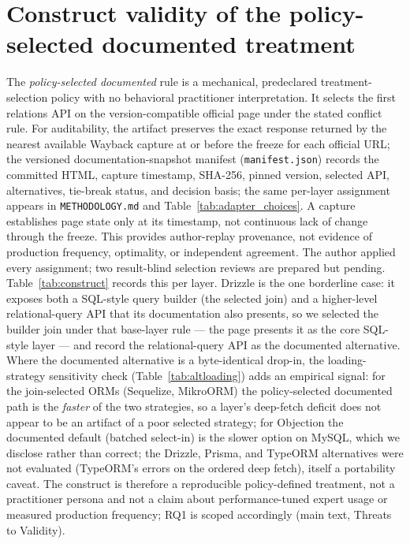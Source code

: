 \documentclass[11pt,a4paper]{article}
\begin{document}
\section{Construct validity of the policy-selected documented treatment}
\label{sup:construct}
The \emph{policy-selected documented} rule is a mechanical, predeclared treatment-selection policy with no behavioral practitioner interpretation. It selects the first relations API on the version-compatible official page under the stated conflict rule. For auditability, the artifact preserves the exact response returned by the nearest available Wayback capture at or before the freeze for each official URL; the versioned documentation-snapshot manifest (\texttt{manifest.json}) records the committed HTML, capture timestamp, SHA-256, pinned version, selected API, alternatives, tie-break status, and decision basis; the same per-layer assignment appears in \texttt{METHODOLOGY.md} and Table~\ref{tab:adapter_choices}. A capture establishes page state only at its timestamp, not continuous lack of change through the freeze. This provides author-replay provenance, not evidence of production frequency, optimality, or independent agreement. The author applied every assignment; two result-blind selection reviews are prepared but pending. Table~\ref{tab:construct} records this per layer. Drizzle is the one borderline case: it exposes both a SQL-style query builder (the selected join) and a higher-level relational-query API that its documentation also presents, so we selected the builder join under that base-layer rule --- the page presents it as the core SQL-style layer --- and record the relational-query API as the documented alternative.
Where the documented alternative is a byte-identical drop-in, the loading-strategy sensitivity
check (Table~\ref{tab:altloading}) adds an empirical signal: for the join-selected ORMs (Sequelize,
MikroORM) the policy-selected documented path is the \emph{faster} of the two strategies, so a
layer's deep-fetch deficit does not appear to be an artifact of a poor selected strategy; for Objection the documented
default (batched select-in) is the slower option on MySQL, which we disclose rather than correct; the
Drizzle, Prisma, and TypeORM alternatives were not evaluated (TypeORM's errors on the ordered
deep fetch), itself a portability caveat. The construct is therefore a reproducible policy-defined treatment, not a practitioner persona and not a claim about performance-tuned expert usage or measured production frequency; RQ1 is scoped accordingly (main text, Threats to Validity).
\end{document}

